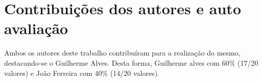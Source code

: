 \documentclass{report}
\begin{document}
\chapter*{Contribuições dos autores e auto avaliação}
Ambos os autores deste trabalho contribuíram para a realização do mesmo, destacando-se o Guilherme Alves. Desta forma, Guilherme alves com 60\% (17/20 valores) e João Ferreira com 40\% (14/20 valores).

\printbibliography
\end{document}
